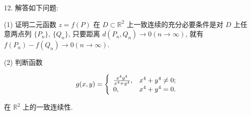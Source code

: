 \documentclass{examcollection}
\renewcommand{\displayformula}[1]{\[#1\]}
\begin{document}
{\begin{minipage}{\textwidth}
12. 解答如下问题:\par
(1) 证明二元函数 $z = f(P)$ 在 $D \subset \mathbb{R}^2$ 上一致连续的充分必要条件是对 $D$ 上任意两点列 $\{P_n\}$, $\{Q_n\}$, 只要距离 $d(P_n, Q_n) \to 0 (n \to \infty)$, 就有 $f(P_n) - f(Q_n) \to 0 (n \to \infty)$.\par
(2) 判断函数\par
\displayformula{g (x, y) = \left\{ \begin{array}{l l} \frac {x ^ {4} y ^ {4}}{x ^ {4} + y ^ {4}}, & x ^ {4} + y ^ {4} \neq 0; \\ 0, & x ^ {4} + y ^ {4} = 0. \end{array} \right.}\par
在 $\mathbb{R}^2$ 上的一致连续性.\par
\end{minipage}}
\ifdim\dimexpr\ht\proofbox+\dp\proofbox\relax>\textheight
\noindent\resizebox{!}{\textheight}{\usebox{\proofbox}}\else\noindent\usebox{\proofbox}\fi\clearpage
\end{document}

